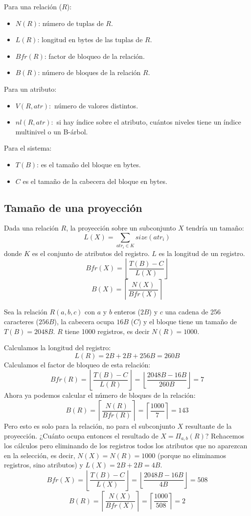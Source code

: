 Para una relación ($R$):
\begin{itemize}
\item $N(R)$: número de tuplas de $R$.
\item $L(R)$: longitud en bytes de las tuplas de $R$.
\item $Bfr(R)$: factor de bloqueo de la relación.
\item $B(R)$: número de bloques de la relación $R$.
\end{itemize}
Para un atributo:
\begin{itemize}
\item $V(R,atr):$ número de valores distintos.
\item $nl(R,atr):$ si hay índice sobre el atributo, cuántos niveles tiene un índice multinivel o un B-árbol.
\end{itemize}
Para el sistema:
\begin{itemize}
\item $T(B)$: es el tamaño del bloque en bytes.
\item $C$ es el tamaño de la cabecera del bloque en bytes.
\end{itemize}

\subsection{Tamaño de una proyección}

Dada una relación $R$, la proyección sobre un subconjunto $X$ tendría un tamaño:
\[
L(X)=\sum_{atr_i\in K}size(atr_i)
\]
donde $K$ es el conjunto de atributos del registro. $L$ es la longitud de un registro.
\[
Bfr(X)=\left\lfloor\frac{T(B)-C}{L(X)}\right\rfloor
\]
\[
B(X)=\left\lceil\frac{N(X)}{Bfr(X)}\right\rceil
\]
\begin{example}
Sea la relación $R(a,b,c)$ con $a$ y $b$ enteros ($2B$) y $c$ una cadena de 256 caracteres ($256B$), la cabecera ocupa $16B$ ($C$) y el bloque tiene un tamaño de $T(B)=2048B$. $R$ tiene 1000 registros, es decir $N(R)=1000$.

Calculamos la longitud del registro:
\[
L(R)=2B+2B+256B=260B
\]
Calculamos el factor de bloqueo de esta relación:
\[
Bfr(R)=\left\lfloor\frac{T(B)-C}{L(R)}\right\rfloor=\left\lfloor\frac{2048B-16B}{260B}\right\rfloor=7
\]
Ahora ya podemos calcular el número de bloques de la relación:
\[
B(R)=\left\lceil\frac{N(R)}{Bfr(R)}\right\rceil=\left\lceil\frac{1000}{7}\right\rceil=143
\]
Pero esto es solo para la relación, no para el subconjunto $X$ resultante de la proyección. ¿Cuánto ocupa entonces el resultado de $X=\Pi_{a,b}(R)$? Rehacemos los cálculos pero eliminando de los registros todos los atributos que no aparezcan en la selección, es decir, $N(X)=N(R)=1000$ (porque no eliminamos registros, sino atributos) y $L(X)=2B+2B=4B$.
\[
Bfr(X)=\left\lfloor\frac{T(B)-C}{L(X)}\right\rfloor=\left\lfloor\frac{2048B-16B}{4B}\right\rfloor=508
\]
\[
B(R)=\left\lceil\frac{N(X)}{Bfr(X)}\right\rceil=\left\lceil\frac{1000}{508}\right\rceil=2
\]
\end{example}

